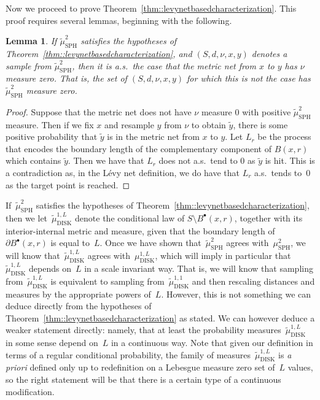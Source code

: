 \documentclass[JEP,XML,SOM,Unicode]{cedram}
\newcommand{\sbullet}{{\scriptscriptstyle\bullet}}
\theoremstyle{plain}
\numberwithin{theorem}{section}
\newtheorem{lemma}[theorem]{Lemma}
\theoremstyle{definition}
\newcommand{\mustwo}{\mu_{\mathrm{SPH}}^2}
\newcommand{\mudonel}{\mu_{ \mathrm{DISK}}^{1, L}}
\newcommand{\tmustwo}{\wt{\mu}_{\mathrm{SPH}}^2}
\newcommand{\tmudonel}{\wt{\mu}_{ \mathrm{DISK}}^{1, L}}
\def\tmudonelset#1{\wt{\mu}_{ \mathrm{DISK}}^{1, #1}}
\let\wt\widetilde
\newcommand{\fb}[2]{B^\sbullet(#1,#2)}
\begin{document}
Now we proceed to prove Theorem~\ref{thm::levynetbasedcharacterization}. This proof requires several lemmas, beginning with the following.

\begin{lemma}
\label{lem::metricnetmeasurezero}
If $\tmustwo$ satisfies the hypotheses of Theorem~\ref{thm::levynetbasedcharacterization}, and $(S,d,\nu,x,y)$ denotes a sample from $\tmustwo$, then it is a.s.\ the case that the metric net from $x$ to $y$ has $\nu$ measure zero. That is, the set of $(S,d,\nu,x,y)$ for which this is not the case has $\tmustwo$ measure zero.
\end{lemma}
\begin{proof}
Suppose that the metric net does not have $\nu$ measure $0$ with positive $\tmustwo$ measure. Then if we fix $x$ and resample $y$ from $\nu$ to obtain $\wt{y}$, there is some positive probability that $\wt{y}$ is in the metric net from $x$ to $y$. Let $L_r$ be the process that encodes the boundary length of the complementary component of $B(x,r)$ which contains $\wt{y}$. Then we have that $L_r$ does not a.s.\ tend to $0$ as $\wt{y}$ is hit. This is a contradiction as, in the Lévy net definition, we do have that $L_r$ a.s.\ tends to~$0$ as the target point is reached.
\end{proof}

If~$\tmustwo$ satisfies the hypotheses of Theorem~\ref{thm::levynetbasedcharacterization}, then we let~$\tmudonel$ denote the conditional law of $S \setminus \fb{x}{r}$, together with its interior-internal metric and measure, given that the boundary length of~$\partial \fb{x}{r}$ is equal to~$L$. Once we have shown that~$\tmustwo$ agrees with~$\mustwo$, we will know that~$\tmudonel$ agrees with~$\mudonel$, which will imply in particular that~$\tmudonel$ depends on~$L$ in a scale invariant way. That is, we will know that sampling from~$\tmudonel$ is equivalent to sampling from~$\tmudonelset{1}$ and then rescaling distances and measures by the appropriate powers of~$L$. However, this is not something we can deduce directly from the hypotheses of Theorem~\ref{thm::levynetbasedcharacterization} as stated. We can however deduce a weaker statement directly: namely, that at least the probability measures~$\tmudonel$ in some sense depend on~$L$ in a continuous way. Note that given our definition in terms of a regular conditional probability, the family of measures~$\tmudonel$ is \emph{a priori} defined only up to redefinition on a Lebesgue measure zero set of~$L$ values, so the right statement will be that there is a certain type of a continuous modification.
\end{document}
